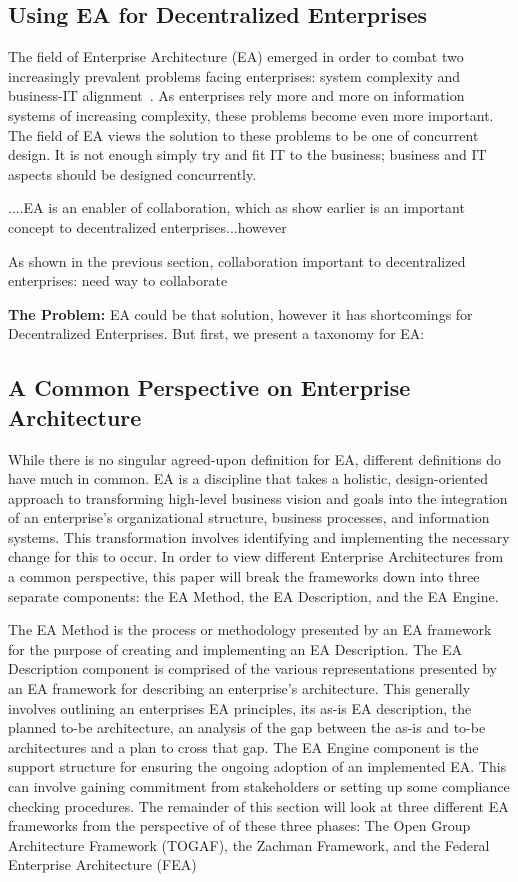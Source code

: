 \subsection{Using EA for Decentralized Enterprises}
The field of Enterprise Architecture (EA) emerged in order to combat two increasingly prevalent problems facing enterprises: system complexity and business-IT alignment~\cite{sessions2007}. As enterprises rely more and more on information systems of increasing complexity, these problems become even more important. The field of EA views the solution to these problems to be one of concurrent design. It is not enough simply try and fit IT to the business; business and IT aspects should be designed concurrently.

....EA is an enabler of collaboration, which as show earlier is an important concept to decentralized enterprises...however 
   
As shown in the previous section, collaboration important to decentralized enterprises: need way to collaborate
    
\textbf{The Problem: }EA could be that solution, however it has shortcomings for Decentralized Enterprises. But first, we present a taxonomy for EA:

\subsection{A Common Perspective on Enterprise Architecture}
While there is no singular agreed-upon definition for EA, different definitions\cite{jungle2004,GartnerInc,ross2006,pearlson2009,lankhorst2009,sessions2007,togaf9.1} do have much in common. EA is a discipline that takes a holistic, design-oriented approach to transforming high-level business vision and goals into the integration of an enterprise's organizational structure, business processes, and information systems. This transformation involves identifying and implementing the necessary change for this to occur. In order to view different Enterprise Architectures from a common perspective, this paper will break the frameworks down into three separate components: the EA Method, the EA Description, and the EA Engine. 

The EA Method is the process or methodology presented by an EA framework for the purpose of creating and implementing an EA Description. The EA Description component is comprised of the various representations presented by an EA framework for describing an enterprise's architecture. This generally involves outlining an enterprises EA principles, its as-is EA description,  the planned to-be architecture, an analysis of the gap between the as-is and to-be architectures and a plan to cross that gap. The EA Engine component is the support structure for ensuring the ongoing adoption of an implemented EA. This can involve gaining commitment from stakeholders or setting up some compliance checking procedures. The remainder of this section will look at three different EA frameworks from the perspective of of these three phases: The Open Group Architecture Framework (TOGAF), the Zachman Framework, and the Federal Enterprise Architecture (FEA)

